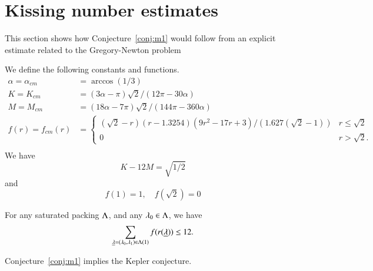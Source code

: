 \section{Kissing number estimates}

This section shows how Conjecture~\ref{conj:m1} would follow from an explicit estimate
related to the Gregory-Newton problem


We define the following constants and functions.
$$
\begin{array}{lll}
\alpha=\alpha_{cm} &= \arccos(1/3)\\
K=K_{cm} &= (3\alpha-\pi)\sqrt2/(12\pi - 30\alpha)\\
M = M_{cm} &= (18\alpha-7\pi)\sqrt2/(144\pi-360\alpha)\\
f(r) = f_{cm}(r) &=
\begin{cases}
 (\sqrt2-r) (r-1.3254) (9r^2 - 17 r + 3)/(1.627 (\sqrt2-1))& r\le\sqrt2\\
 0 & r >\sqrt2.
\end{cases}
\\
\end{array}
$$
We have 
\begin{equation}\label{eqn:km}K - 12M = \sqrt{1/2}\end{equation}
and
\begin{equation}f(1) = 1,\quad f(\sqrt2) =0\end{equation}


\begin{conjecture}[Marchal-2]\label{conj:m1} For any saturated packing $\Lambda$, and
any $\lambda_0\in\Lambda$, we have
$$
\sum_{{\underline{\lambda}}=(\lambda_0,\lambda_1)\in\Lambda(1)} f(r({\underline{\lambda}})) \le 12.
$$
\end{conjecture}

\begin{theorem}
Conjecture~\ref{conj:m1} implies the Kepler conjecture.
\end{theorem}

